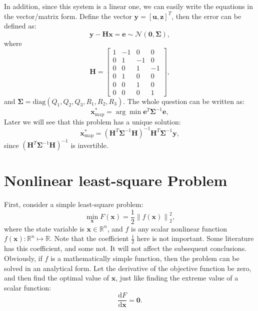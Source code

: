 In addition, since this system is a linear one, we can easily write the equations in the vector/matrix form. Define the vector $\mathbf{y}=[\mathbf{u}, \mathbf{z}]^T$, then the error can be defined as:
\begin{equation}
    \mathbf{y}-\mathbf{H}\mathbf{x} = \mathbf{e} \sim \mathcal{N}(\mathbf{0}, \boldsymbol{\Sigma}),
\end{equation}
where
\begin{equation}
    \mathbf{H} = \left[ {\begin{array}{*{20}{c}}
            1&{-1}&0&0\\
            0&1&{-1}&0\\
            0&0&1&{-1}\\
            \hline
            0&1&0&0\\
            0&0&1&0\\
            0&0&0&1
    \end{array}} \right],
\end{equation}
and $\boldsymbol{\Sigma}=\mathrm{diag}(Q_1, Q_2, Q_3, R_1, R_2, R_3)$. The whole question can be written as:
\begin{equation}
    \mathbf{x}^*_{\mathrm{map}} = \arg \min \mathbf{e}^T \boldsymbol{\Sigma}^{-1} \mathbf{e},
\end{equation}
Later we will see that this problem has a unique solution:
\begin{equation}
    \mathbf{x}^*_{\mathrm{map}} = (\mathbf{H}^T \boldsymbol{\Sigma}^{-1} \mathbf{H})^{-1} \mathbf{H}^T \boldsymbol{\Sigma}^{-1} \mathbf{y},
\end{equation}
since $(\mathbf{H}^T \boldsymbol{\Sigma}^{-1} \mathbf{H})^{-1}$ is invertible.

\section{Nonlinear least-square Problem}
\label{sec:6.2}
First, consider a simple least-square problem:
\begin{equation}
    \mathop {\min }\limits_{\mathbf{x}} F(\mathbf{x}) = \frac{1}{2}{\left\| {f\left( \mathbf{x} \right) } \right\|^2_2},
\end{equation}
where the state variable is $\mathbf{x} \in \mathbb{R}^n$, and $f$ is any scalar nonlinear function $f(\mathbf{x}): \mathbb{R}^n \mapsto \mathbb{R}$. Note that the coefficient $\frac{1}{2}$ here is not important. Some literature has this coefficient, and some not. It will not affect the subsequent conclusions. Obviously, if $f$ is a mathematically simple function, then the problem can be solved in an analytical form. Let the derivative of the objective function be zero, and then find the optimal value of $\mathbf{x}$, just like finding the extreme value of a scalar function:
\begin{equation}
    \frac{ \mathrm{d} F}{ \mathrm{d} \mathbf{x}} = \mathbf{0}.
\end{equation}


